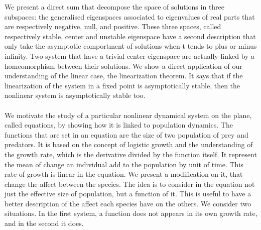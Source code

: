 We present a direct sum that decompose the space of solutions in three subspaces: the generalised eigenspaces associated to eigenvalues of real parts that are respectively negative, null, and positive. These three spaces, called respectively stable, center and unstable eigenspace have a second description that only take the asymptotic comportment of solutions when t tends to plus or minus infinity. Two system that have a trivial center eigenspace are actually linked by a homeomorphism between their solutions. We show a direct application of our understanding of the linear case, the linearization theorem. It says that if the linearization of the system in a fixed point is asymptotically stable, then the nonlinear system is asymptotically stable too. 
\\ \\
We motivate the study of a particular nonlinear dynamical system on the plane, called \LV equations, by showing how it is linked to population dynamics. The functions that are set in an equation are the size of two population of prey and predators. It is based on the concept of logistic growth and the understanding of the growth rate, which is the derivative divided by the function itself. It represent the mean of change an individual add to the population by unit of time. This rate of growth is linear in the \LV equation. We present a modification on it, that change the affect between the species. The idea is to consider in the equation not just the effective size of population, but a function of it. This is useful to have a better description of the affect each species have on the others. We consider two situations. In the first system, a function does not appears in its own growth rate, and in the second it does. 

